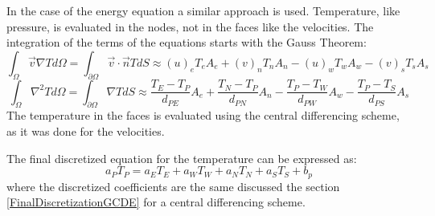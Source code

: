 In the case of the energy equation a similar approach is used. Temperature, like pressure, is evaluated in the nodes, not in the faces like the velocities. The integration of the terms of the equations starts with the Gauss Theorem:
\begin{equation}
\int_{\Omega}\vec{v}\nabla Td\Omega=\int_{\partial\Omega}\vec{v}\cdot\vec{n} TdS\approx\left(u\right)_{e}T_{e}A_{e}+\left(v\right)_{n}T_{n}A_{n}-\left(u\right)_{w}T_{w}A_{w}-\left(v\right)_{s}T_{s}A_{s}
\end{equation}
\begin{equation}
	\int_{\Omega}\nabla^{2}Td\Omega=\int_{\partial\Omega}\nabla TdS\approx\frac{T_{E}-T_{P}}{d_{PE}}A_{e}+\frac{T_{N}-T_{P}}{d_{PN}}A_{n}-\frac{T_{P}-T_{W}}{d_{PW}}A_{w}-\frac{T_{P}-T_{S}}{d_{PS}}A_{s}
\end{equation}
The temperature in the faces is evaluated using the central differencing scheme, as it was done for the velocities.

The final discretized equation for the temperature can be expressed as:
\begin{equation}
a_{P}T_{P}=a_{E}T_{E}+a_{W}T_{W}+a_{N}T_{N}+a_{S}T_{S}+b_{p}
\end{equation}
where the discretized coefficients are the same discussed the section \ref{FinalDiscretizationGCDE} for a central differencing scheme.

